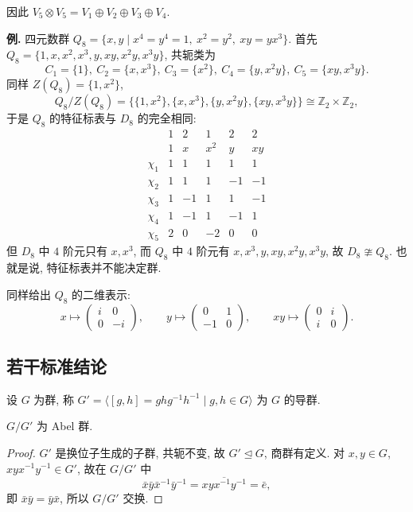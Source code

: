 因此 $V_5\otimes V_5=V_1\oplus V_2\oplus V_3\oplus V_4$.

\noindent\textbf{例.} 四元数群
$Q_8=\{x,y\mid x^4=y^4=1,\ x^2=y^2,\ xy=yx^3\}$.
首先 $Q_8=\{1,x,x^2,x^3,y,xy,x^2y,x^3y\}$, 共轭类为
\[
  C_1=\{1\},\ C_2=\{x,x^3\},\ C_3=\{x^2\},\ C_4=\{y,x^2y\},\ C_5=\{xy,x^3y\}.
\]
同样 $Z(Q_8)=\{1,x^2\}$,
\[
  Q_8/Z(Q_8)=\bigl\{\{1,x^2\},\{x,x^3\},\{y,x^2y\},\{xy,x^3y\}\bigr\}
  \cong\mathbb{Z}_2\times\mathbb{Z}_2,
\]
于是 $Q_8$ 的特征标表与 $D_8$ 的完全相同:
\[
\begin{array}{c|ccccc}
  & 1 & 2 & 1 & 2 & 2\\
  & 1 & x & x^2 & y & xy\\ \hline
  \chi_1 & 1 & 1 & 1 & 1 & 1\\
  \chi_2 & 1 & 1 & 1 & -1 & -1\\
  \chi_3 & 1 & -1 & 1 & 1 & -1\\
  \chi_4 & 1 & -1 & 1 & -1 & 1\\
  \chi_5 & 2 & 0 & -2 & 0 & 0
\end{array}
\]
但 $D_8$ 中 $4$ 阶元只有 $x,x^3$, 而 $Q_8$ 中 $4$ 阶元有 $x,x^3,y,xy,x^2y,x^3y$,
故 $D_8\ncong Q_8$. 也就是说, 特征标表并不能决定群.

同样给出 $Q_8$ 的二维表示:
\[
  x\mapsto\begin{pmatrix}i&0\\0&-i\end{pmatrix},\qquad
  y\mapsto\begin{pmatrix}0&1\\-1&0\end{pmatrix},\qquad
  xy\mapsto\begin{pmatrix}0&i\\i&0\end{pmatrix}.
\]

\subsection{若干标准结论}\label{sec:supplement}

\begin{definition}[导群]\label{def:commutator-subgroup}
设 $G$ 为群, 称 $G'=\langle[g,h]=ghg^{-1}h^{-1}\mid g,h\in G\rangle$ 为 $G$ 的导群.
\end{definition}

\begin{lemma}\label{lem:abelian-quotient}
$G/G'$ 为 Abel 群.
\end{lemma}

\begin{proof}
$G'$ 是换位子生成的子群, 共轭不变, 故 $G'\trianglelefteq G$, 商群有定义. 对 $x,y\in G$,
$xyx^{-1}y^{-1}\in G'$, 故在 $G/G'$ 中
\[
  \bar x\bar y\bar x^{-1}\bar y^{-1}=\overline{xyx^{-1}y^{-1}}=\bar e,
\]
即 $\bar x\bar y=\bar y\bar x$, 所以 $G/G'$ 交换.
\end{proof}

